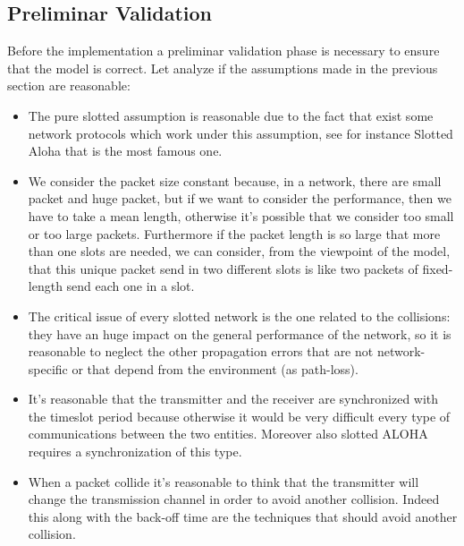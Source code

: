 \subsection{Preliminar Validation}
Before the implementation a preliminar validation phase is necessary to ensure that the model is correct. Let analyze if the assumptions made in the previous section are reasonable:
\begin{itemize}
	\item The pure slotted assumption is reasonable due to the fact that exist some network protocols which work under this assumption, see for instance Slotted Aloha that is the most famous one.
	\item We consider the packet size constant because, in a network, there are small packet and huge packet, but if we want to consider the performance, then we have to take a mean length, otherwise it's possible that we consider too small or too large packets. Furthermore if the packet length is so large that more than one slots are needed, we can consider, from the viewpoint of the model, that this unique packet send in two different slots is like two packets of fixed-length send each one in a slot.
	\item The critical issue of every slotted network is the one related to the collisions: they have an huge impact on the general performance of the network, so it is reasonable to neglect the other propagation errors that are not network-specific or that depend from the environment (as path-loss).
	\item It's reasonable that the transmitter and the receiver are synchronized with the timeslot period because otherwise it would be very difficult every type of communications between the two entities. Moreover also slotted ALOHA requires a synchronization of this type.
	\item When a packet collide it's reasonable to think that the transmitter will change the transmission channel in order to avoid another collision. Indeed this along with the back-off time are the techniques that should avoid another collision. 
\end{itemize}
